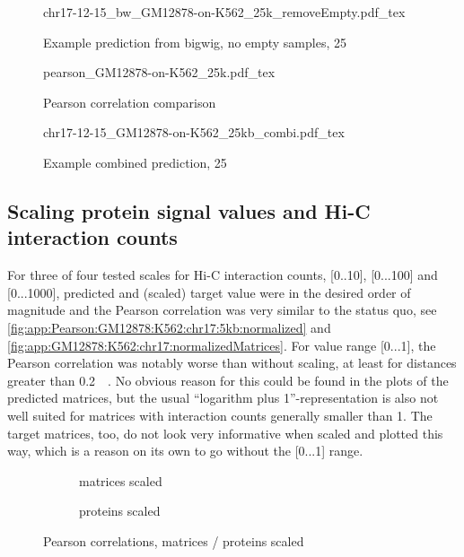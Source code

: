 \begin{figure}[hp]
 \centering
 \scriptsize
 {chr17-12-15_bw_GM12878-on-K562_25k_removeEmpty.pdf_tex}
 \caption{Example prediction from bigwig, no empty samples, \SI{25}{\kilo\bp}}
 \label{fig:results:bigwig:noemptysamples:25k}
\end{figure}
\begin{figure}[hp]
 \centering
 \scriptsize
 {pearson_GM12878-on-K562_25k.pdf_tex}
 \caption{Pearson correlation comparison}
 \label{fig:results:bigwig:Pearson25k}
\end{figure}
\begin{figure}[hp]
 \centering
 \scriptsize
 {chr17-12-15_GM12878-on-K562_25kb_combi.pdf_tex}
 \caption{Example combined prediction, \SI{25}{\kilo\bp}}
 \label{fig:results:combined:chr17:25k}
\end{figure}

\subsection{Scaling protein signal values and Hi-C interaction counts} \label{sec:res:normalization}
For three of four tested scales for Hi-C interaction counts, [0..10], [0...100] and [0...1000],
predicted and (scaled) target value were in the desired order of magnitude and 
the Pearson correlation was very similar to the status quo, 
see \autoref{fig:app:Pearson:GM12878:K562:chr17:5kb:normalized} and 
\ref{fig:app:GM12878:K562:chr17:normalizedMatrices}.
For value range [0...1], the Pearson correlation was notably worse than without scaling, 
at least for distances greater than \SI{0.2}{\mega\bp}.
No obvious reason for this could be found in the plots of the predicted matrices, 
but the usual ``logarithm plus 1''-representation is also not well suited 
for matrices with interaction counts generally smaller than 1. 
The target matrices, too, do not look very informative when scaled and plotted this way,
which is a reason on its own to go without the [0...1] range.
\begin{figure}[hb]
 \centering
 \begin{subfigure}{.495\textwidth}
  \centering
  \caption{matrices scaled}
  \label{fig:app:Pearson:GM12878:K562:chr17:5kb:normalized}
 \end{subfigure}\hfill
\begin{subfigure}{.495\textwidth}
  \centering
  \caption{proteins scaled}
  \label{fig:app:Pearson:GM12878:K562:chr17:5kb:protsNormalized}
 \end{subfigure}
 \caption{Pearson correlations, matrices / proteins scaled}
 \label{fig:res:Pearson:matrices:proteins:normalized:5kb}
\end{figure}

